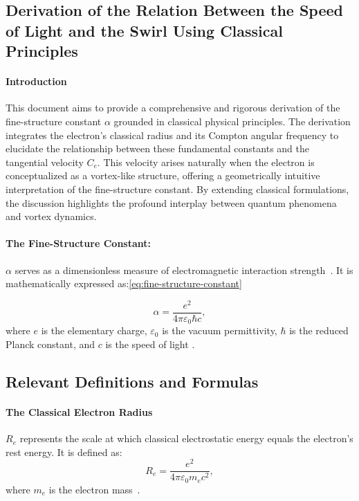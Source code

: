 
\subsection{Derivation of the Relation Between the Speed of Light and the Swirl Using Classical Principles}\label{subsec:derivation-of-the-relation-between-the-speed-of-light-and-the-swirl-using-classical-principles}

\paragraph*{Introduction}
    This document aims to provide a comprehensive and rigorous derivation of the fine-structure constant $\alpha$ grounded in classical physical principles.
    The derivation integrates the electron's classical radius and its Compton angular frequency to elucidate the relationship between these fundamental constants and the tangential velocity $C_e$.
    This velocity arises naturally when the electron is conceptualized as a vortex-like structure, offering a geometrically intuitive interpretation of the fine-structure constant.
    By extending classical formulations, the discussion highlights the profound interplay between quantum phenomena and vortex dynamics.


\paragraph*{The Fine-Structure Constant:}
 $\alpha$ serves as a dimensionless measure of electromagnetic interaction strength~\cite{maxwell1861}.
It is mathematically expressed as:\ref{eq:fine-structure-constant}

\begin{equation}
    \alpha = \frac{e^2}{4\pi \varepsilon_0 \hbar c},\label{eq:fine-structure-constant}
\end{equation}
where $e$ is the elementary charge, $\varepsilon_0$ is the vacuum permittivity, $\hbar$ is the reduced Planck constant, and $c$ is the speed of light \cite{dirac1930quantum}.

\subsection*{Relevant Definitions and Formulas}
\paragraph*{The Classical Electron Radius}
$R_e$ represents the scale at which classical electrostatic energy equals the electron's rest energy. It is defined as:
\begin{equation*}
    R_e = \frac{e^2}{4\pi \varepsilon_0 m_e c^2},
\end{equation*}
where $m_e$ is the electron mass~\cite{helmholtz1858}.

